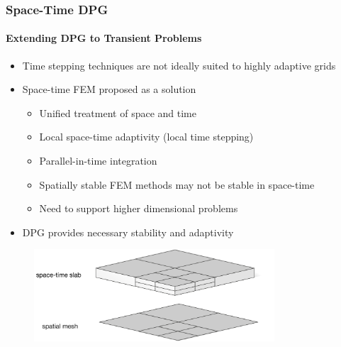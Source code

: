 \documentclass[18pt,xcolor=table]{beamer}
\begin{document}
\begin{frame}[t]
\frametitle{Space-Time DPG}
\framesubtitle{Extending DPG to Transient Problems}
\begin{itemize}
  \item Time stepping techniques are not ideally suited to highly adaptive grids
  \item Space-time FEM proposed as a solution
  \begin{itemize}
    \item[\textcolor{green}{\Checkmark}] Unified treatment of space and time
    \item[\textcolor{green}{\Checkmark}] Local space-time adaptivity (local time stepping)
    \item[\textcolor{green}{\Checkmark}] Parallel-in-time integration
    \item[\XSolidBrush] Spatially stable FEM methods may not be stable in space-time
    \item[\XSolidBrush] Need to support higher dimensional problems
  \end{itemize}
  \item DPG provides necessary stability and adaptivity
\end{itemize}
\begin{figure}[b]
\centering
\includegraphics[width=0.8\textwidth]{Schematics/SpaceTimeSchematic}
\end{figure}

\end{frame}
\end{document}
